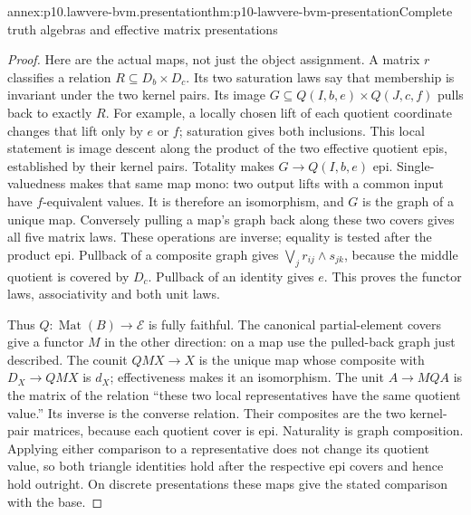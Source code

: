 \begin{annexitem}{annex:p10.lawvere-bvm.presentation}{thm:p10-lawvere-bvm-presentation}{Complete truth algebras and effective matrix presentations}
\begin{proof}
Here are the actual maps, not just the object assignment. A matrix
\(r\) classifies a relation \(R\subseteq D_b\times D_c\).
Its two saturation laws say that membership is invariant under the two
kernel pairs. Its image \(G\subseteq Q(I,b,e)\times Q(J,c,f)\)
pulls back to exactly \(R\). For example, a locally chosen lift of
each quotient coordinate changes that lift only by \(e\) or \(f\);
saturation gives both inclusions. This local statement is image descent
along the product of the two effective quotient epis, established by
their kernel pairs. Totality makes \(G\to Q(I,b,e)\) epi.
Single-valuedness makes that same map mono: two output lifts with a
common input have \(f\)-equivalent values. It is therefore an
isomorphism, and \(G\) is the graph of a unique map. Conversely
pulling a map's graph back along these two covers gives all five
matrix laws. These operations are inverse; equality is tested after
the product epi. Pullback of a composite graph gives
\(\bigvee_j r_{ij}\wedge s_{jk}\), because the middle quotient
is covered by \(D_c\). Pullback of an identity gives \(e\).
This proves the functor laws, associativity and both unit laws.

Thus \(Q:\operatorname{Mat}(B)\to\mathcal E\) is fully faithful.
The canonical partial-element covers give a functor \(M\) in the
other direction: on a map use the pulled-back graph just described.
The counit \(QM X\to X\) is the unique map whose composite with
\(D_X\to QM X\) is \(d_X\); effectiveness makes it an
isomorphism. The unit \(A\to MQ A\) is the matrix of the relation
``these two local representatives have the same quotient value.''
Its inverse is the converse relation. Their composites are the two
kernel-pair matrices, because each quotient cover is epi. Naturality
is graph composition. Applying either comparison to a representative
does not change its quotient value, so both triangle identities hold
after the respective epi covers and hence hold outright. On discrete
presentations these maps give the stated comparison with the base.
\end{proof}
\end{annexitem}

